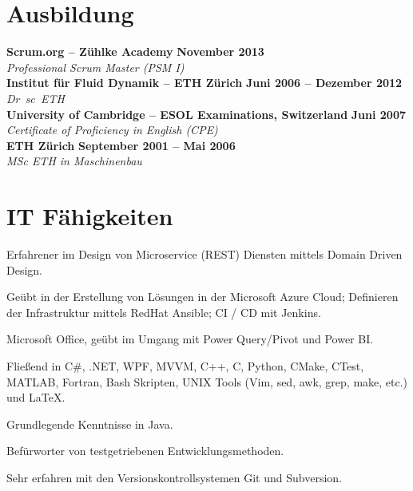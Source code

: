 \documentclass[line,11pt,a4paper]{resume}
\begin{document}
\begin{resume}
\section{\mysidestyle Ausbildung}\vspace{2mm}

\textbf{Scrum.org -- Zühlke Academy} \hfill \textbf{November 2013}\\
\vspace{1mm}%
\textsl{Professional Scrum Master (PSM I)}\\
\vspace{-1mm}%
%
\textbf{Institut für Fluid Dynamik -- ETH Zürich}
  \hfill \textbf{Juni 2006 -- Dezember 2012}\\
\vspace{1mm}%
\textsl{Dr\ sc\ ETH}\\
\vspace{-1mm}%
%
\textbf{University of Cambridge -- ESOL Examinations, Switzerland}
  \hfill \textbf{Juni 2007}\\
\vspace{1mm}%
\textsl{Certificate of Proficiency in English (CPE)}\\
\vspace{-1mm}%
%
\textbf{ETH Zürich} \hfill \textbf{September 2001 -- Mai 2006}\\
\vspace{1mm}%
\textsl{MSc ETH in Maschinenbau}

\section{\mysidestyle IT Fähigkeiten}\vspace{6mm}
\begin{list2}
  \item Erfahrener im Design von Microservice (REST) Diensten mittels Domain
    Driven Design.
  \item Geübt in der Erstellung von Lösungen in der Microsoft Azure Cloud;
    Definieren der Infrastruktur mittels RedHat Ansible; CI / CD mit Jenkins.
  \item Microsoft Office, geübt im Umgang mit Power Query/Pivot und Power BI.
  \item Flie{\ss}end in C\#, .NET, WPF, MVVM, C++, C, Python, CMake, CTest,
    MATLAB, Fortran, Bash Skripten, UNIX Tools (Vim, sed, awk, grep, make,
    etc.) und {\selectfont\LaTeX}.
  \item Grundlegende Kenntnisse in Java.
  \item Befürworter von testgetriebenen Entwicklungsmethoden.
  \item Sehr erfahren mit den Versionskontrollsystemen Git und Subversion.
\end{list2}


\end{resume}
\end{document}
